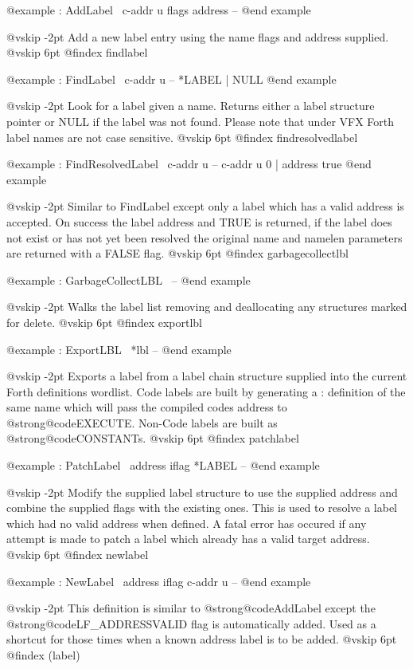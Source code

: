 @example
: AddLabel              \ c-addr u flags address -- @end example

@vskip -2pt
Add a new label entry using the name flags and address supplied.
@vskip 6pt
@findex findlabel

@example
: FindLabel     \ c-addr u -- *LABEL | NULL @end example

@vskip -2pt
Look for a label given a name. Returns either a label structure
pointer or NULL if the label was not found. Please note that under
VFX Forth label names are not case sensitive.
@vskip 6pt
@findex findresolvedlabel

@example
: FindResolvedLabel     \ c-addr u -- c-addr u 0 | address true @end example

@vskip -2pt
Similar to FindLabel except only a label which has a valid address
is accepted. On success the label address and TRUE is returned, if
the label does not exist or has not yet been resolved the original
name and namelen parameters are returned with a FALSE flag.
@vskip 6pt
@findex garbagecollectlbl

@example
: GarbageCollectLBL     \ -- @end example

@vskip -2pt
Walks the label list removing and deallocating any structures
marked for delete.
@vskip 6pt
@findex exportlbl

@example
: ExportLBL             \ *lbl -- @end example

@vskip -2pt
Exports a label from a label chain structure supplied into the
current Forth definitions wordlist. Code labels are built by
generating a : definition of the same name which will pass the
compiled codes address to @strong{@code{EXECUTE}}. Non-Code labels are
built as @strong{@code{CONSTANT}}s.
@vskip 6pt
@findex patchlabel

@example
: PatchLabel            \ address iflag *LABEL -- @end example

@vskip -2pt
Modify the supplied label structure to use the supplied address
and combine the supplied flags with the existing ones. This is
used to resolve a label which had no valid address when defined.
A fatal error has occured if any attempt is made to patch a label
which already has a valid target address.
@vskip 6pt
@findex newlabel

@example
: NewLabel              \ address iflag c-addr u -- @end example

@vskip -2pt
This definition is similar to @strong{@code{AddLabel}} except the @strong{@code{LF_ADDRESSVALID}}
flag is automatically added. Used as a shortcut for those times
when a known address label is to be added.
@vskip 6pt
@findex (label)

